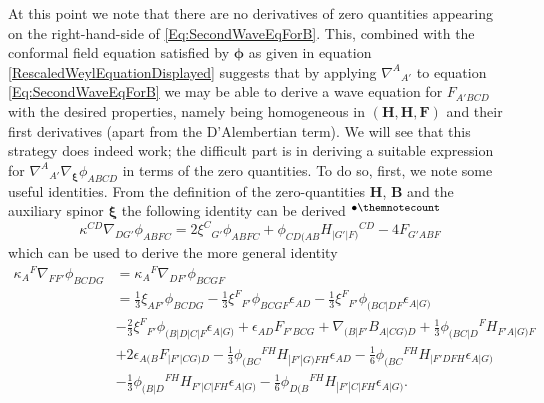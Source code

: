 \documentclass[10pt,a4paper]{article}
\theoremstyle{plain}
\def\bmh{{\bm h}}
\def\bmB{{\bm B}}
\def\bmF{{\bm F}}
\def\bmH{{\bm H}}
\def\bmX{{\bm X}}
\newcounter{mnotecount}%
\newcommand{\mnotex}[1]%
{\protect{\stepcounter{mnotecount}}$^{\mbox{\footnotesize $\bullet$\themnotecount}}$ 
\marginpar{%
\raggedright\tiny\em
$\!\!\!\!\!\!\,\bullet$\themnotecount: #1} }
\begin{document}
  

At this point we note that there are no derivatives of zero quantities
appearing on the right-hand-side of \eqref{Eq:SecondWaveEqForB}. This,
combined with the conformal field equation satisfied by
$\bm\phi$ as given in equation \eqref{RescaledWeylEquationDisplayed}
suggests
that by applying $\nabla^A{}_{A'}$ to equation
\eqref{Eq:SecondWaveEqForB} we may be able to derive a wave equation
for $F_{A'BCD}$ with the desired properties, namely being homogeneous
in $(\bmH, \bmH, \bmF)$ and their first derivatives (apart from the
D'Alembertian term). We will see that this strategy does indeed work;
the difficult part is in deriving a suitable expression for
$\nabla^A{}_{A'}\nabla_{\bm\xi}\phi_{ABCD}$ in terms of the zero
quantities.
To do so, first, we note some useful identities.  From the definition
of the zero-quantities $\bmH$, $\bmB$ and the auxiliary spinor
$\bm\xi$ the following identity can be derived \mnotex{Put in
  appendix?}
\begin{equation}
 \kappa^{CD} \nabla_{DG'}\phi_{ABFC} = 2 \xi^{C}{}_{G'} \phi_{ABFC} +
 \phi_{CD(AB} H_{\vert G'\vert F)}{}^{CD} - 4
 F_{G'ABF}\label{Eq:MiscIdentity}
 \end{equation}
which can be used to derive the more general identity
\begin{align}
    \kappa_{A}{}^{F} \nabla_{FF'}\phi_{BCDG} &=\kappa_{A}{}^{F}
    \nabla_{DF'}\phi_{BCGF} \nonumber\\ &= \tfrac{1}{3} \xi_{AF'}
    \phi_{BCDG} - \tfrac{1}{3} \xi^{F}{}_{F'} \phi_{BCGF}
    \epsilon_{AD} - \tfrac{1}{3}
    \xi^{F}{}_{F'}\phi_{(BC|DF}\epsilon_{A|G)} \nonumber \\ & -
    \tfrac{2}{3} \xi^{F}{}_{F'}\phi_{(B|D|C|F}\epsilon_{A|G)} +
    \epsilon_{AD} F_{F'BCG} + \nabla_{(B|F'}B_{A|CG)D} + \tfrac{1}{3}
    \phi_{(BC|D}{}^{F}H_{F'A|G)F} \nonumber \\& + 2
    \epsilon_{A(B}F_{|F'\vert CG)D} - \tfrac{1}{3}
    \phi_{(BC}{}^{FH}H_{|F'|G)FH}\epsilon_{AD} - \tfrac{1}{6}
    \phi_{(BC}{}^{FH}H_{|F'DFH}\epsilon_{A|G)} \nonumber\\ & -
    \tfrac{1}{3} \phi_{(B|D}{}^{FH}H_{F'|C|FH}\epsilon_{A|G)} -
    \tfrac{1}{6}
    \phi_{D(B}{}^{FH}H_{|F'|C|FH}\epsilon_{A|G)}.\label{Eq:MiscIdentity2}
\end{align}
\end{document}

